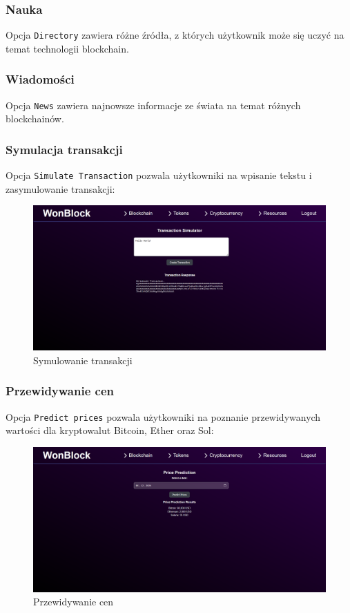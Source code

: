 \subsubsection{Nauka}
Opcja \texttt{Directory} zawiera różne źródła, z których użytkownik może się uczyć na temat technologii blockchain.
\subsubsection{Wiadomości}
Opcja \texttt{News} zawiera najnowsze informacje ze świata na temat różnych blockchainów.
\subsubsection{Symulacja transakcji}
Opcja \texttt{Simulate Transaction} pozwala użytkowniki na wpisanie tekstu i zasymulowanie transakcji:

\begin{figure}[htb]
    \centering
    \includegraphics[width=0.8\linewidth]{./instrukcja/SimulateTransaction.png}
    \caption{Symulowanie transakcji}
    \label{fig:Symulowanie transakcji}
\end{figure}

\subsubsection{Przewidywanie cen}
Opcja \texttt{Predict prices} pozwala użytkowniki na poznanie przewidywanych wartości dla kryptowalut Bitcoin, Ether oraz Sol:
\begin{figure}[htb]
    \centering
    \includegraphics[width=0.8\linewidth]{./instrukcja/PredictPrices.png}
    \caption{Przewidywanie cen}
    \label{fig:Przewidywanie cen}
\end{figure}